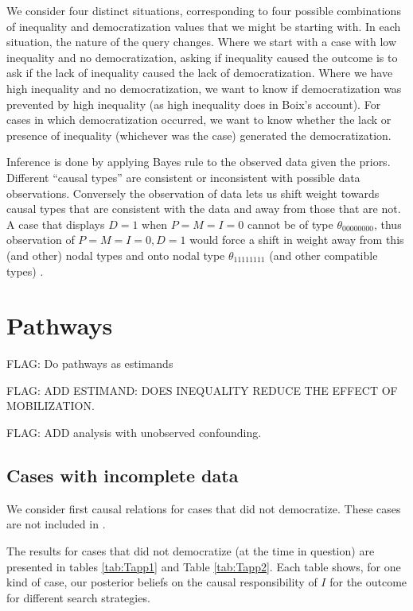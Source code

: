 \documentclass[12pt,]{book}
\begin{document}
We consider four distinct situations, corresponding to four possible combinations of inequality and democratization values that we might be starting with. In each situation, the nature of the query changes. Where we start with a case with low inequality and no democratization, asking if inequality caused the outcome is to ask if the lack of inequality caused the lack of democratization. Where we have high inequality and no democratization, we want to know if democratization was prevented by high inequality (as high inequality does in Boix's account). For cases in which democratization occurred, we want to know whether the lack or presence of inequality (whichever was the case) generated the democratization.

Inference is done by applying Bayes rule to the observed data given the priors. Different ``causal types'' are consistent or inconsistent with possible data observations. Conversely the observation of data lets us shift weight towards causal types that are consistent with the data and away from those that are not. A case that displays \(D=1\) when \(P=M=I=0\) cannot be of type \(\theta_{00000000}\), thus observation of \(P=M=I=0, D=1\) would force a shift in weight away from this (and other) nodal types and onto nodal type \(\theta_{11111111}\) (and other compatible types) .

\hypertarget{pathways}{%
\section{Pathways}\label{pathways}}

FLAG: Do pathways as estimands

FLAG: ADD ESTIMAND: DOES INEQUALITY REDUCE THE EFFECT OF MOBILIZATION.

FLAG: ADD analysis with unobserved confounding.

\hypertarget{cases-with-incomplete-data}{%
\subsection{Cases with incomplete data}\label{cases-with-incomplete-data}}

We consider first causal relations for cases that did not democratize. These cases are not included in \citet{haggard2012inequality}.

The results for cases that did not democratize (at the time in question) are presented in tables \ref{tab:Tapp1} and Table \ref{tab:Tapp2}. Each table shows, for one kind of case, our posterior beliefs on the causal responsibility of \(I\) for the outcome for different search strategies.
\end{document}
